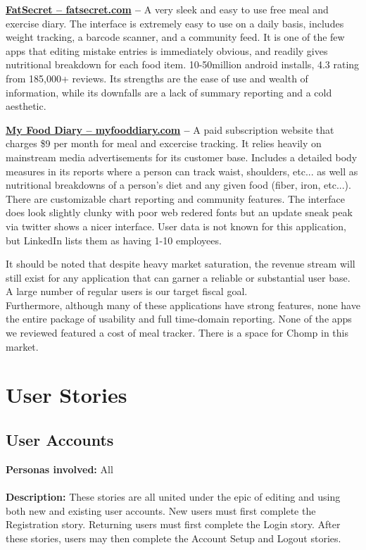 \documentclass[a4paper,12pt]{article}
\begin{document}
\begin{list}{•}{•}
\item \textbf{\href{http://www.fatsecret.com}{FatSecret -- fatsecret.com} -- }A very sleek and easy to use free meal and exercise diary.  The interface is extremely easy to use on a daily basis, includes weight tracking, a barcode scanner, and a community feed.  It is one of the few apps that editing mistake entries is immediately obvious, and readily gives nutritional breakdown for each food item.  10-50million android installs, 4.3 rating from 185,000+ reviews.  Its strengths are the ease of use and wealth of information, while its downfalls are a lack of summary reporting and a cold aesthetic.
\item \textbf{\href{http://www.myfooddiary.com}{My Food Diary -- myfooddiary.com} -- }A paid subscription website that charges \$9 per month for meal and excercise tracking.  It relies heavily on mainstream media advertisements for its customer base.  Includes a detailed body measures in its reports where a person can track waist, shoulders, etc... as well as nutritional breakdowns of a person's diet and any given food (fiber, iron, etc...).  There are customizable chart reporting and community features. The interface does look slightly clunky with poor web redered fonts but an update sneak peak via twitter shows a nicer interface.  User data is not known for this application, but LinkedIn lists them as having 1-10 employees.
\end{list}
It should be noted that despite heavy market saturation, the revenue stream will still exist for any application that can garner a reliable or substantial user base.  A large number of regular users is our target fiscal goal.\\
Furthermore, although many of these applications have strong features, none have the entire package of usability and full time-domain reporting.  None of the apps we reviewed featured a cost of meal tracker.  There is a space for Chomp in this market.
\section{User Stories}
\subsection{User Accounts}
\textbf{Personas involved:} All\\
\\
\textbf{Description:} These stories are all united under the epic of editing and using both new and existing user accounts.  New users must first complete the Registration story.  Returning users must first complete the Login story.  After these stories, users may then complete the Account Setup and Logout stories.
\end{document}
